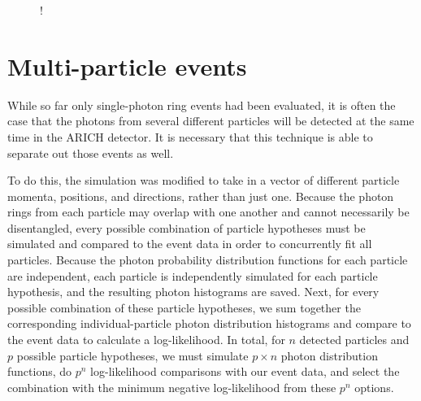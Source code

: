 \begin{figure}[]
\centering
{}
\caption[\TODO{}]{!}
\end{figure}

\section{Multi-particle events}
While so far only single-photon ring events had been evaluated, it is often the case that the photons from several different particles will be detected at the same time in the ARICH detector.
It is necessary that this technique is able to separate out those events as well. 

To do this, the simulation was modified to take in a vector of different particle momenta, positions, and directions, rather than just one.
Because the photon rings from each particle may overlap with one another and cannot necessarily be disentangled, every possible combination of particle hypotheses must be simulated and compared to the event data in order to concurrently fit all particles.
Because the photon probability distribution functions for each particle are independent, each particle is independently simulated for each particle hypothesis, and the resulting photon histograms are saved.
Next, for every possible combination of these particle hypotheses, we sum together the corresponding individual-particle photon distribution histograms and compare to the event data to calculate a log-likelihood.
In total, for $n$ detected particles and $p$ possible particle hypotheses, we must simulate $p \times n$ photon distribution functions, do $p^n$  log-likelihood comparisons with our event data, and select the combination with the minimum negative log-likelihood from these $p^n$ options. 

